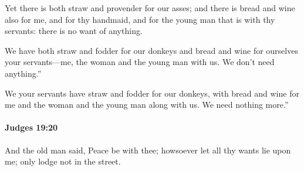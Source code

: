 			\begin{versebox}
					\item[BHS] 
					\item[ASV] Yet there is both straw and provender for our asses; and there is bread and wine also for me, and for thy handmaid, and for the young man that is with thy servants: there is no want of anything.
					\item[NIV] We have both straw and fodder for our donkeys and bread and wine for ourselves your servants—me, the woman and the young man with us. We don’t need anything.”
					\item[NRSV] We your servants have straw and fodder for our donkeys, with bread and wine for me and the woman and the young man along with us. We need nothing more.”
			\end{versebox}

		\paragraph{Judges 19:20} %
			\label{JUDGES-19-20}

			And the old man said, Peace be with thee; howsoever let all thy wants lie upon me; only lodge not in the street.

